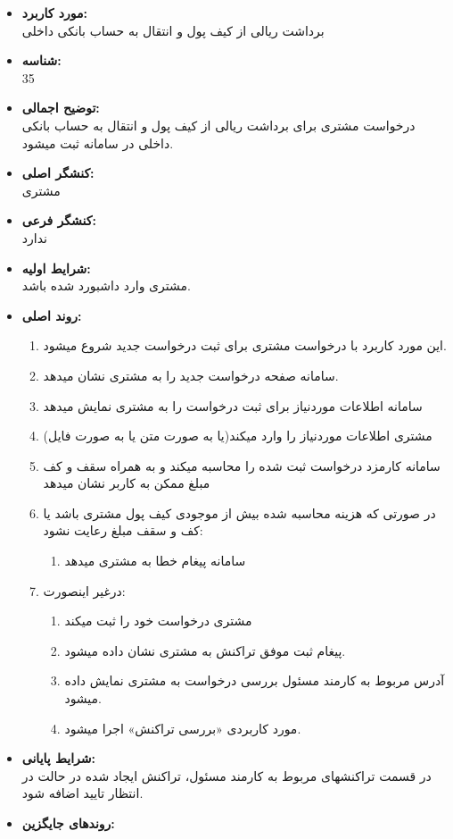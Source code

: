 \documentclass{article}
\begin{document}
\begin{itemize}
\item \textbf{مورد کاربرد:}\\
برداشت ریالی از کیف پول و انتقال به حساب بانکی داخلی
\item \textbf{شناسه:}\\
35
\item \textbf{توضیح اجمالی:}\\
درخواست مشتری برای برداشت ریالی از کیف پول و انتقال به حساب بانکی داخلی در سامانه ثبت میشود.
\item \textbf{کنشگر اصلی:}\\
مشتری
\item \textbf{کنشگر فرعی:}\\
ندارد
\item \textbf{شرایط اولیه:}\\
مشتری وارد داشبورد شده باشد.
\item \textbf{روند اصلی:}\\
\begin{enumerate}
\item  این مورد کاربرد با درخواست مشتری برای ثبت درخواست جدید شروع میشود.
\item سامانه صفحه درخواست جدید را به مشتری نشان میدهد.
\item سامانه اطلاعات موردنیاز برای ثبت درخواست را به مشتری نمایش میدهد
\item مشتری اطلاعات موردنیاز را وارد میکند(یا به صورت متن یا به صورت فایل)
\item سامانه کارمزد درخواست ثبت شده را محاسبه میکند و به همراه سقف و کف مبلغ ممکن به کاربر نشان میدهد
\item در صورتی که هزینه محاسبه شده بیش از موجودی کیف پول مشتری باشد یا کف و سقف مبلغ رعایت نشود:
\begin{enumerate}
\item سامانه پیغام خطا به مشتری میدهد
\end{enumerate}
\item درغیر اینصورت:
\begin{enumerate}
\item مشتری درخواست خود را ثبت میکند
\item پیغام ثبت موفق تراکنش به مشتری نشان داده میشود.
\item آدرس مربوط به کارمند مسئول بررسی درخواست به مشتری نمایش داده میشود.
\item مورد کاربردی «بررسی تراکنش» اجرا میشود.
\end{enumerate}

\end{enumerate}

\item \textbf{شرایط پایانی:}\\ 
در قسمت تراکنشهای مربوط به کارمند مسئول، تراکنش ایجاد شده در حالت در انتظار تایید اضافه شود.
\item \textbf{روندهای جایگزین:}\\

\end{itemize}


\noindent\makebox[\linewidth]{\rule{\paperwidth}{0.4pt}}
\end{document}
